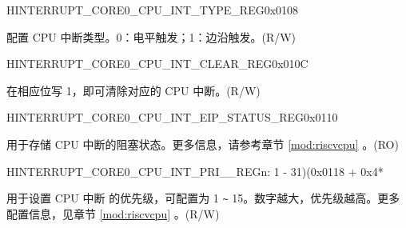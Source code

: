 \begin{register}{H}{INTERRUPT\_CORE0\_CPU\_INT\_TYPE\_REG}{0x0108}\label{regdesc:INTERRUPTCORE0CPUINTTYPEREG}
%
\regnewline%
\begin{regdesc}\begin{reglist}
\label{fielddesc:INTERRUPTCORE0CPUINTTYPE}\item [INTERRUPT\_CORE0\_CPU\_INT\_TYPE] 配置 CPU 中断类型。0：电平触发；1：边沿触发。(R/W)
\end{reglist}\end{regdesc}
\end{register}


\begin{register}{H}{INTERRUPT\_CORE0\_CPU\_INT\_CLEAR\_REG}{0x010C}\label{regdesc:INTERRUPTCORE0CPUINTCLEARREG}
%
\regnewline%
\begin{regdesc}\begin{reglist}
\label{fielddesc:INTERRUPTCORE0CPUINTCLEAR}\item [INTERRUPT\_CORE0\_CPU\_INT\_CLEAR] 在相应位写 1，即可清除对应的 CPU 中断。(R/W)
\end{reglist}\end{regdesc}
\end{register}


\begin{register}{H}{INTERRUPT\_CORE0\_CPU\_INT\_EIP\_STATUS\_REG}{0x0110}\label{regdesc:INTERRUPTCORE0CPUINTEIPSTATUSREG}
%
\regnewline%
\begin{regdesc}\begin{reglist}
\label{fielddesc:INTERRUPTCORE0CPUINTEIPSTATUS}\item [INTERRUPT\_CORE0\_CPU\_INT\_EIP\_STATUS] 用于存储 CPU 中断的阻塞状态。更多信息，请参考章节 \ref{mod:riscvcpu} \textit{}。(RO)
\end{reglist}\end{regdesc}
\end{register}


\begin{register}{H}{INTERRUPT\_CORE0\_CPU\_INT\_PRI\_\_REG}{n: 1 - 31)(0x0118 + 0x4*}\label{regdesc:INTERRUPTCORE0CPUINTPRI0REG}
%
%
\regnewline%
\begin{regdesc}\begin{reglist}
\label{fielddesc:INTERRUPTCORE0CPUPRI0MAP}\item [INTERRUPT\_CORE0\_CPU\_PRI\_\regindex{n}\_MAP] 用于设置 CPU 中断  的优先级，可配置为 1 \verb+~+ 15。数字越大，优先级越高。更多配置信息，见章节 \ref{mod:riscvcpu} \textit{}。(R/W)
\end{reglist}\end{regdesc}
\end{register}

